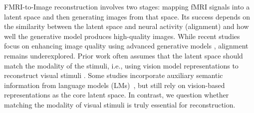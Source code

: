 FMRI-to-Image reconstruction involves two stages: mapping fMRI signals into a latent space and then generating images from that space. Its success depends on the similarity between the latent space and neural activity (alignment) and how well the generative model produces high-quality images.
While recent studies \citep{scotti2023reconstructing, scotti2024mindeye2, mai2024brain} focus on enhancing image quality using advanced generative models \citep{podell2023sdxl, xu2023versatile}, alignment remains underexplored. Prior work often assumes that the latent space should match the modality of the stimuli, i.e., using vision model representations to reconstruct visual stimuli \citep{scotti2023reconstructing, wang2024decoding, xia2024dream}. Some studies incorporate auxiliary semantic information from language models (LMs)~\citep{lin2022mind, quan2024psychometry}, but still rely on vision-based representations as the core latent space. In contrast, we question whether matching the modality of visual stimuli is truly essential for reconstruction.
